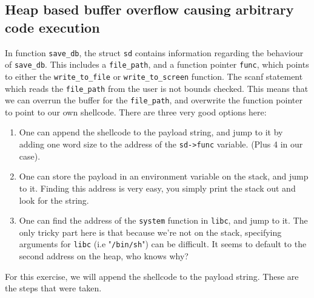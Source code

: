 \documentclass[]{article}
\begin{document}
\subsection*{Heap based buffer overflow causing arbitrary code execution}
In function \texttt{save\_db}, the struct \texttt{sd} contains information regarding the behaviour of \texttt{save\_db}. This includes a \texttt{file\_path}, and a function pointer \texttt{func}, which points to either the \texttt{write\_to\_file} or \texttt{write\_to\_screen} function. The scanf statement which reads the \texttt{file\_path} from the user is not bounds checked. This means that we can overrun the buffer for the \texttt{file\_path}, and overwrite the function pointer to point to our own shellcode.
There are three very good options here:
\begin{enumerate}
	\item One can append the shellcode to the payload string, and jump to it by adding one word size to the address of the \texttt{sd->func} variable. (Plus 4 in our case).
	\item One can store the payload in an environment variable on the stack, and jump to it. Finding this address is very easy, you simply print the stack out and look for the string.
	\item One can find the address of the \texttt{system} function in \texttt{libc}, and jump to it. The only tricky part here is that because we're not on the stack, specifying arguments for \texttt{libc} (i.e "\texttt{/bin/sh}") can be difficult. It seems to default to the second address on the heap, who knows why?
\end{enumerate} 
 For this exercise, we will append the shellcode to the payload string. These are the steps that were taken.
\end{document}
